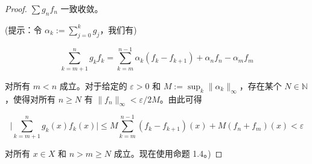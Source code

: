 \begin{proof}

$ \sum g_n f_n $ 一致收敛。

(提示：令 $ \alpha_k := \sum_{j=0}^k g_j $，我们有)

\[
\sum_{k=m+1}^{n}g_{k}f_{k}=\sum_{k=m}^{n-1}\alpha_{k}(f_{k}-f_{k+1})+\alpha_{n}f_{n}-\alpha_{m}f_{m}
\]

对所有 $m < n$ 成立。对于给定的 $\varepsilon > 0$ 和 $M := \sup_k \|\alpha_k\|_\infty$，存在某个 $N \in \mathbb{N}$，使得对所有 $n \geq N$ 有 $\|f_n\|_\infty < \varepsilon/2M$。由此可得

\[
\bigg|\sum_{k=m+1}^{n}g_{k}(x)f_{k}(x)\bigg|\leq M\sum_{k=m}^{n-1}(f_{k}-f_{k+1})(x)+M(f_{n}+f_{m})(x)<\varepsilon
\]

对所有 $ x \in X $ 和 $ n > m \geq N $ 成立。现在使用命题 1.4。)

\end{proof}

